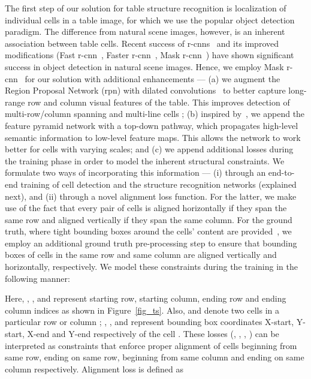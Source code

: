 \documentclass[runningheads]{llncs}
\begin{document}
The first step of our solution for table structure recognition is localization of individual cells in a table image, for which we use the popular object detection paradigm. The difference from natural scene images, however, is an inherent association between table cells.  Recent success of {\sc r-cnn}s~\cite{girshick2014rich} and its improved modifications (Fast {\sc r-cnn}~\cite{girshick2015fast}, Faster {\sc r-cnn}~\cite{ren2015faster}, Mask {\sc r-cnn}~\cite{he2017mask}) have shown significant success in object detection in natural scene images. Hence, we employ Mask {\sc r-cnn}~\cite{he2017mask} for our solution with additional enhancements --- (a) we augment the Region Proposal Network ({\sc rpn}) with dilated convolutions~\cite{yu2015multi,chen2017deeplab} to better capture long-range row and column visual features of the table. This improves detection of multi-row/column spanning and multi-line cells ; (b) inspired by~\cite{woo2019gated}, we append the feature pyramid network with a top-down pathway, which propagates high-level semantic information to low-level feature maps. This allows the network to work better for cells with varying scales; and (c) we append additional losses during the training phase in order to model the inherent structural constraints. We formulate two ways of incorporating this information --- (i) through an end-to-end training of cell detection and the structure recognition networks (explained next), and (ii) through a novel alignment loss function. For the latter, we make use of the fact that every pair of cells is aligned horizontally if they span the same row and aligned vertically if they span the same column. For the ground truth, where tight bounding boxes around the cells' content are provided~\cite{gobel2013icdar,chi2019complicated,zhong2019image}, we employ an additional ground truth pre-processing step to ensure that bounding boxes of cells in the same row and same column are aligned vertically and horizontally, respectively. We model these constraints during the training in the following manner:

Here, , ,  and  represent starting row, starting column, ending row and ending column indices as shown in Figure~\ref{fig_ts}. Also,  and  denote two cells in a particular row  or column ; , ,  and  represent bounding box coordinates X-start, Y-start, X-end and Y-end respectively of the cell . These losses (, , , ) can be interpreted as constraints that enforce proper alignment of cells beginning from same row, ending on same row, beginning from same column and ending on same column respectively. Alignment loss is defined as
\end{document}
